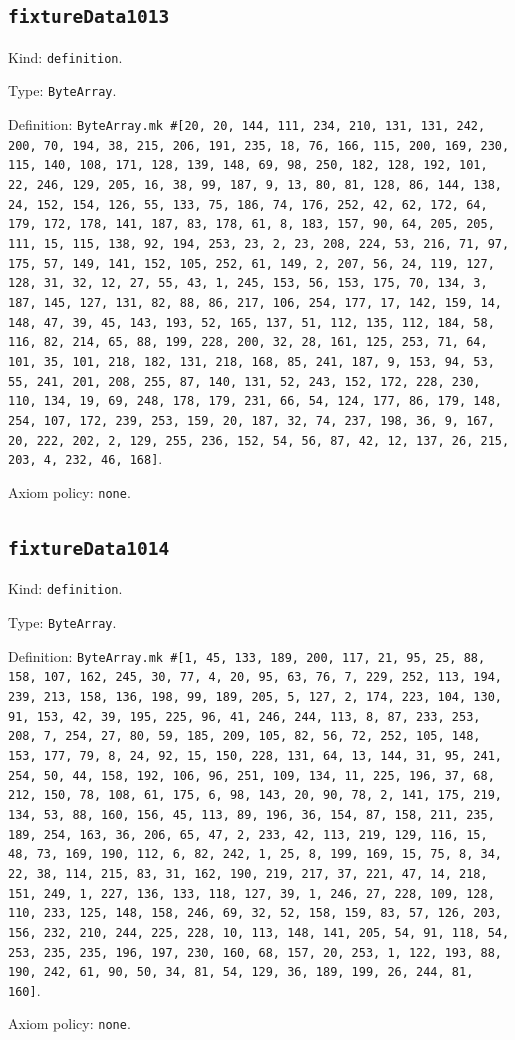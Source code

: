 \documentclass[11pt]{article}
\begin{document}
\subsection*{\texttt{fixtureData1013}}
\noindent Kind: \texttt{definition}.\par
\noindent Type: \texttt{ByteArray}.\par
\noindent Definition: \texttt{ByteArray.mk \#[20, 20, 144, 111, 234, 210, 131, 131, 242, 200, 70, 194, 38, 215, 206, 191, 235, 18, 76, 166, 115, 200, 169, 230, 115, 140, 108, 171, 128, 139, 148, 69, 98, 250, 182, 128, 192, 101, 22, 246, 129, 205, 16, 38, 99, 187, 9, 13, 80, 81, 128, 86, 144, 138, 24, 152, 154, 126, 55, 133, 75, 186, 74, 176, 252, 42, 62, 172, 64, 179, 172, 178, 141, 187, 83, 178, 61, 8, 183, 157, 90, 64, 205, 205, 111, 15, 115, 138, 92, 194, 253, 23, 2, 23, 208, 224, 53, 216, 71, 97, 175, 57, 149, 141, 152, 105, 252, 61, 149, 2, 207, 56, 24, 119, 127, 128, 31, 32, 12, 27, 55, 43, 1, 245, 153, 56, 153, 175, 70, 134, 3, 187, 145, 127, 131, 82, 88, 86, 217, 106, 254, 177, 17, 142, 159, 14, 148, 47, 39, 45, 143, 193, 52, 165, 137, 51, 112, 135, 112, 184, 58, 116, 82, 214, 65, 88, 199, 228, 200, 32, 28, 161, 125, 253, 71, 64, 101, 35, 101, 218, 182, 131, 218, 168, 85, 241, 187, 9, 153, 94, 53, 55, 241, 201, 208, 255, 87, 140, 131, 52, 243, 152, 172, 228, 230, 110, 134, 19, 69, 248, 178, 179, 231, 66, 54, 124, 177, 86, 179, 148, 254, 107, 172, 239, 253, 159, 20, 187, 32, 74, 237, 198, 36, 9, 167, 20, 222, 202, 2, 129, 255, 236, 152, 54, 56, 87, 42, 12, 137, 26, 215, 203, 4, 232, 46, 168]}.\par
\noindent Axiom policy: \texttt{none}.\par
\subsection*{\texttt{fixtureData1014}}
\noindent Kind: \texttt{definition}.\par
\noindent Type: \texttt{ByteArray}.\par
\noindent Definition: \texttt{ByteArray.mk \#[1, 45, 133, 189, 200, 117, 21, 95, 25, 88, 158, 107, 162, 245, 30, 77, 4, 20, 95, 63, 76, 7, 229, 252, 113, 194, 239, 213, 158, 136, 198, 99, 189, 205, 5, 127, 2, 174, 223, 104, 130, 91, 153, 42, 39, 195, 225, 96, 41, 246, 244, 113, 8, 87, 233, 253, 208, 7, 254, 27, 80, 59, 185, 209, 105, 82, 56, 72, 252, 105, 148, 153, 177, 79, 8, 24, 92, 15, 150, 228, 131, 64, 13, 144, 31, 95, 241, 254, 50, 44, 158, 192, 106, 96, 251, 109, 134, 11, 225, 196, 37, 68, 212, 150, 78, 108, 61, 175, 6, 98, 143, 20, 90, 78, 2, 141, 175, 219, 134, 53, 88, 160, 156, 45, 113, 89, 196, 36, 154, 87, 158, 211, 235, 189, 254, 163, 36, 206, 65, 47, 2, 233, 42, 113, 219, 129, 116, 15, 48, 73, 169, 190, 112, 6, 82, 242, 1, 25, 8, 199, 169, 15, 75, 8, 34, 22, 38, 114, 215, 83, 31, 162, 190, 219, 217, 37, 221, 47, 14, 218, 151, 249, 1, 227, 136, 133, 118, 127, 39, 1, 246, 27, 228, 109, 128, 110, 233, 125, 148, 158, 246, 69, 32, 52, 158, 159, 83, 57, 126, 203, 156, 232, 210, 244, 225, 228, 10, 113, 148, 141, 205, 54, 91, 118, 54, 253, 235, 235, 196, 197, 230, 160, 68, 157, 20, 253, 1, 122, 193, 88, 190, 242, 61, 90, 50, 34, 81, 54, 129, 36, 189, 199, 26, 244, 81, 160]}.\par
\noindent Axiom policy: \texttt{none}.\par
\end{document}
